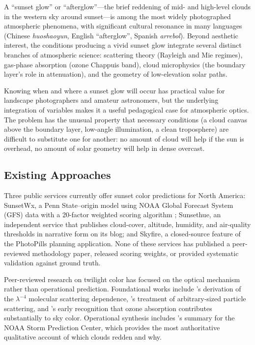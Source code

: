 \documentclass[11pt,a4paper]{article}
\begin{document}
A ``sunset glow'' or ``afterglow''---the brief reddening of mid- and high-level clouds in the western sky around sunset---is among the most widely photographed atmospheric phenomena, with significant cultural resonance in many languages (Chinese \textit{huoshaoyun}, English ``afterglow'', Spanish \textit{arrebol}). Beyond aesthetic interest, the conditions producing a vivid sunset glow integrate several distinct branches of atmospheric science: scattering theory (Rayleigh and Mie regimes), gas-phase absorption (ozone Chappuis band), cloud microphysics (the boundary layer's role in attenuation), and the geometry of low-elevation solar paths.

Knowing when and where a sunset glow will occur has practical value for landscape photographers and amateur astronomers, but the underlying integration of variables makes it a useful pedagogical case for atmospheric optics. The problem has the unusual property that necessary conditions (a cloud canvas above the boundary layer, low-angle illumination, a clean troposphere) are difficult to substitute one for another: no amount of cloud will help if the sun is overhead, no amount of solar geometry will help in dense overcast.

\subsection{Existing Approaches}

Three public services currently offer sunset color predictions for North America: SunsetWx, a Penn State--origin model using NOAA Global Forecast System (GFS) data with a 20-factor weighted scoring algorithm \citep{forecastingbeauty2015}; Sunsethue, an independent service that publishes cloud-cover, altitude, humidity, and air-quality thresholds in narrative form on its blog; and Skyfire, a closed-source feature of the PhotoPills planning application. None of these services has published a peer-reviewed methodology paper, released scoring weights, or provided systematic validation against ground truth.

Peer-reviewed research on twilight color has focused on the optical mechanism rather than operational prediction. Foundational works include \citet{strutt1871scattering}'s derivation of the $\lambda^{-4}$ molecular scattering dependence, \citet{mie1908beitrage}'s treatment of arbitrary-sized particle scattering, and \citet{hulburt1953explanation}'s early recognition that ozone absorption contributes substantially to sky color. Operational synthesis includes \citet{corfidi2014colors}'s summary for the NOAA Storm Prediction Center, which provides the most authoritative qualitative account of which clouds redden and why.
\end{document}
